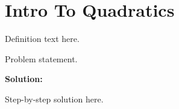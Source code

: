 \section{Intro To Quadratics}


\begin{definition}[Term]
Definition text here.
\end{definition}

\begin{example}
Problem statement.

\textbf{Solution:}

Step-by-step solution here.
\end{example}
